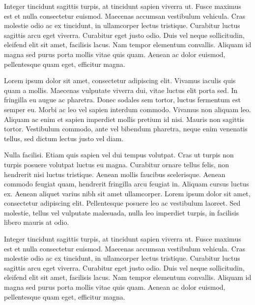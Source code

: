 Integer tincidunt sagittis turpis, at tincidunt sapien viverra ut. Fusce maximus est et nulla consectetur euismod. Maecenas accumsan vestibulum vehicula. Cras molestie odio ac ex tincidunt, in ullamcorper lectus tristique. Curabitur luctus sagittis arcu eget viverra. Curabitur eget justo odio. Duis vel neque sollicitudin, eleifend elit sit amet, facilisis lacus. Nam tempor elementum convallis. Aliquam id magna sed purus porta mollis vitae quis quam. Aenean ac dolor euismod, pellentesque quam eget, efficitur magna.\par
Lorem ipsum dolor sit amet, consectetur adipiscing elit. Vivamus iaculis quis quam a mollis. Maecenas vulputate viverra dui, vitae luctus elit porta sed. In fringilla eu augue ac pharetra. Donec sodales sem tortor, luctus fermentum est semper eu. Morbi ac leo vel sapien interdum commodo. Vivamus non aliquam leo. Aliquam ac enim et sapien imperdiet mollis pretium id nisi. Mauris non sagittis tortor. Vestibulum commodo, ante vel bibendum pharetra, neque enim venenatis tellus, sed dictum lectus justo vel diam.\par
Nulla facilisi. Etiam quis sapien vel dui tempus volutpat. Cras ut turpis non turpis posuere volutpat luctus eu magna. Curabitur ornare tellus felis, non hendrerit nisi luctus tristique. Aenean mollis faucibus scelerisque. Aenean commodo feugiat quam, hendrerit fringilla arcu feugiat in. Aliquam cursus luctus ex. Aenean aliquet varius nibh sit amet ullamcorper. Lorem ipsum dolor sit amet, consectetur adipiscing elit. Pellentesque posuere leo ac vestibulum laoreet. Sed molestie, tellus vel vulputate malesuada, nulla leo imperdiet turpis, in facilisis libero mauris at odio.\par
Integer tincidunt sagittis turpis, at tincidunt sapien viverra ut. Fusce maximus est et nulla consectetur euismod. Maecenas accumsan vestibulum vehicula. Cras molestie odio ac ex tincidunt, in ullamcorper lectus tristique. Curabitur luctus sagittis arcu eget viverra. Curabitur eget justo odio. Duis vel neque sollicitudin, eleifend elit sit amet, facilisis lacus. Nam tempor elementum convallis. Aliquam id magna sed purus porta mollis vitae quis quam. Aenean ac dolor euismod, pellentesque quam eget, efficitur magna.\par
